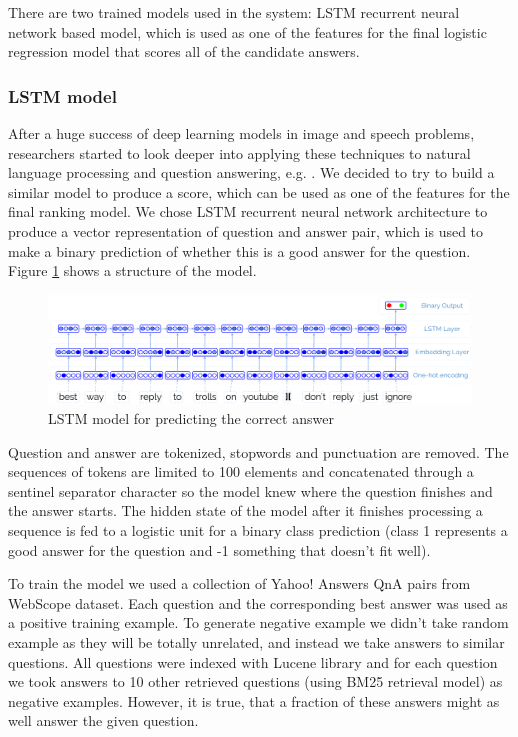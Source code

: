 \documentclass[]{article}
\begin{document}
There are two trained models used in the system: LSTM recurrent neural network based model, which is used as one of the features for the final logistic regression model that scores all of the candidate answers.

\subsubsection{LSTM model}

After a huge success of deep learning models in image and speech problems, researchers started to look deeper into applying these techniques to natural language processing and question answering, e.g. \cite{yu2014deep,diwang_lstm_2015}.
We decided to try to build a similar model to produce a score, which can be used as one of the features for the final ranking model.
We chose LSTM recurrent neural network architecture to produce a vector representation of question and answer pair, which is used to make a binary prediction of whether this is a good answer for the question.
Figure \ref{figure:lstm_model} shows a structure of the model.

\begin{figure}
	\includegraphics[width=470px]{img/qa_lstm}
	\caption{LSTM model for predicting the correct answer}
	\label{figure:lstm_model}
\end{figure}

Question and answer are tokenized, stopwords and punctuation are removed.
The sequences of tokens are limited to 100 elements and concatenated through a sentinel separator character so the model knew where the question finishes and the answer starts.
The hidden state of the model after it finishes processing a sequence is fed to a logistic unit for a binary class prediction (class 1 represents a good answer for the question and -1 something that doesn't fit well).

To train the model we used a collection of Yahoo! Answers QnA pairs from WebScope dataset.
Each question and the corresponding best answer was used as a positive training example.
To generate negative example we didn't take random example as they will be totally unrelated, and instead we take answers to similar questions.
All questions were indexed with Lucene library and for each question we took answers to 10 other retrieved questions (using BM25 retrieval model) as negative examples.
However, it is true, that a fraction of these answers might as well answer the given question.
\end{document}
